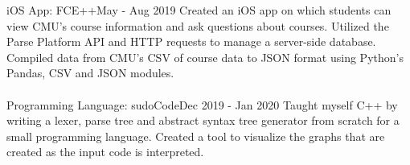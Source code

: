 %
%
%


\begin{projects}

	\project
	{iOS App: FCE++}{May - Aug 2019}
	{
		Created an iOS app on which students can view CMU’s course information and ask questions about courses.  Utilized the Parse Platform API and HTTP requests to manage a server-side database.  Compiled data from CMU’s CSV of course data to JSON format using Python’s Pandas, CSV and JSON modules. \\
    } \\

    \project
	{Programming Language: sudoCode}{Dec 2019 - Jan 2020}
	{
		Taught myself C++ by writing a lexer, parse tree and abstract syntax tree generator from scratch for a small programming language. Created a tool to visualize the graphs that are created as the input code is interpreted.
    }

\end{projects}
